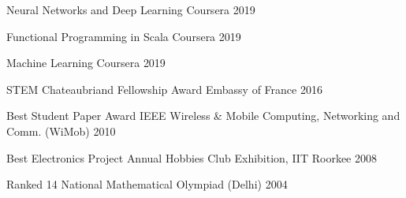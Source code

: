 


\begin{cvhonors}

  \cvhonor
    {Neural Networks and Deep Learning} %
    {Coursera} %
    {} %
    {2019} %
    
  \cvhonor
    {Functional Programming in Scala} %
    {Coursera} %
    {} %
    {2019} %
    
  \cvhonor
    {Machine Learning} %
    {Coursera} %
    {} %
    {2019} %


  \cvhonor
    {STEM Chateaubriand Fellowship Award} %
    {Embassy of France} %
    {} %
    {2016} %

%
  \cvhonor
    {Best Student Paper Award} %
    {IEEE Wireless \& Mobile Computing, Networking and Comm. (WiMob)} %
    {} %
    {2010} %

  \cvhonor
    {Best Electronics Project} %
    {Annual Hobbies Club Exhibition, IIT Roorkee} %
    {} %
    {2008} %
    
  \cvhonor
    {Ranked 14} %
    {National Mathematical Olympiad (Delhi)} %
    {} %
    {2004} %

\end{cvhonors}


